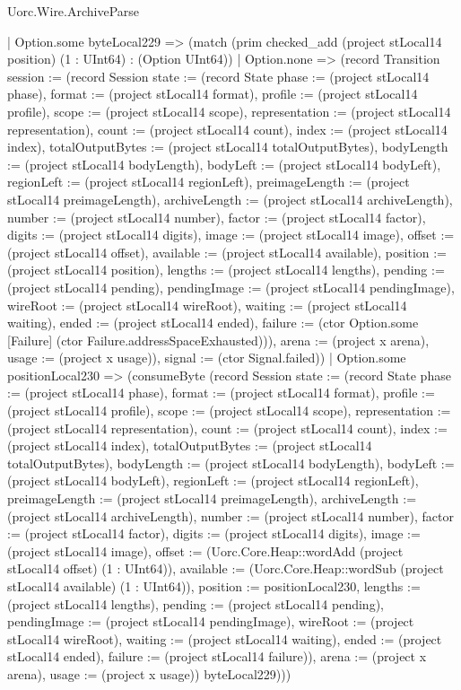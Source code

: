 \begin{lexlean}{Uorc.Wire.ArchiveParse}
\begin{semanticmodule}
{              | Option.some byteLocal229 => (match (prim checked_add (project stLocal14 position) (1 : UInt64) : (Option UInt64))
                | Option.none => (record Transition {session := (record Session {state := (record State {phase := (project stLocal14 phase), format := (project stLocal14 format), profile := (project stLocal14 profile), scope := (project stLocal14 scope), representation := (project stLocal14 representation), count := (project stLocal14 count), index := (project stLocal14 index), totalOutputBytes := (project stLocal14 totalOutputBytes), bodyLength := (project stLocal14 bodyLength), bodyLeft := (project stLocal14 bodyLeft), regionLeft := (project stLocal14 regionLeft), preimageLength := (project stLocal14 preimageLength), archiveLength := (project stLocal14 archiveLength), number := (project stLocal14 number), factor := (project stLocal14 factor), digits := (project stLocal14 digits), image := (project stLocal14 image), offset := (project stLocal14 offset), available := (project stLocal14 available), position := (project stLocal14 position), lengths := (project stLocal14 lengths), pending := (project stLocal14 pending), pendingImage := (project stLocal14 pendingImage), wireRoot := (project stLocal14 wireRoot), waiting := (project stLocal14 waiting), ended := (project stLocal14 ended), failure := (ctor Option.some [Failure] (ctor Failure.addressSpaceExhausted))}), arena := (project x arena), usage := (project x usage)}), signal := (ctor Signal.failed)})
                | Option.some positionLocal230 => (consumeByte (record Session {state := (record State {phase := (project stLocal14 phase), format := (project stLocal14 format), profile := (project stLocal14 profile), scope := (project stLocal14 scope), representation := (project stLocal14 representation), count := (project stLocal14 count), index := (project stLocal14 index), totalOutputBytes := (project stLocal14 totalOutputBytes), bodyLength := (project stLocal14 bodyLength), bodyLeft := (project stLocal14 bodyLeft), regionLeft := (project stLocal14 regionLeft), preimageLength := (project stLocal14 preimageLength), archiveLength := (project stLocal14 archiveLength), number := (project stLocal14 number), factor := (project stLocal14 factor), digits := (project stLocal14 digits), image := (project stLocal14 image), offset := (Uorc.Core.Heap::wordAdd (project stLocal14 offset) (1 : UInt64)), available := (Uorc.Core.Heap::wordSub (project stLocal14 available) (1 : UInt64)), position := positionLocal230, lengths := (project stLocal14 lengths), pending := (project stLocal14 pending), pendingImage := (project stLocal14 pendingImage), wireRoot := (project stLocal14 wireRoot), waiting := (project stLocal14 waiting), ended := (project stLocal14 ended), failure := (project stLocal14 failure)}), arena := (project x arena), usage := (project x usage)}) byteLocal229)))
}
\end{semanticmodule}
\end{lexlean}
